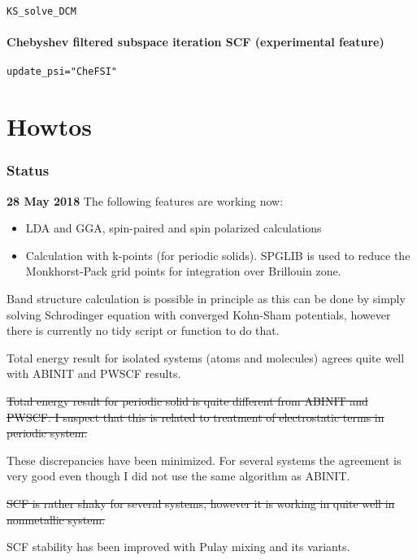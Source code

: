 \documentclass[a4paper,12pt]{article}
\newcommand{\jlcode}[1]{\texttt{#1}}
\begin{document}
\jlcode{KS_solve_DCM}

\subsection{Chebyshev filtered subspace iteration SCF (experimental feature)}

\jlcode{update_psi="CheFSI"}


\part{Howtos}



\section*{Status}

\textbf{28 May 2018} The following features are working now:
\begin{itemize}
\item LDA and GGA, spin-paired and spin polarized calculations
\item Calculation with k-points (for periodic solids).
  \textsf{SPGLIB} is used to reduce the Monkhorst-Pack grid points
  for integration over Brillouin zone.
\end{itemize}

Band structure calculation is possible in principle as this can be
done by simply solving
Schrodinger equation with converged Kohn-Sham potentials, however there
is currently no tidy script or function to do that.

Total energy result for isolated systems (atoms and molecules) agrees quite
well with ABINIT and PWSCF results.

\sout{Total energy result for periodic solid is quite different from ABINIT and PWSCF.
I suspect that this is related to treatment of electrostatic terms in periodic system.}

These discrepancies have been minimized. For several systems the agreement is very good
even though I did not use the same algorithm as ABINIT.

\sout{SCF is rather shaky for several systems, however it is working in quite well in nonmetallic
system.}

SCF stability has been improved with Pulay mixing and its variants.
\end{document}
